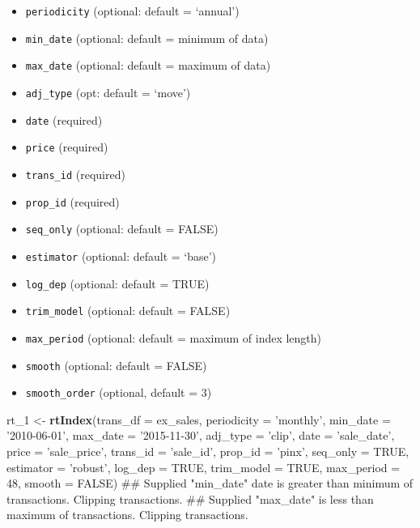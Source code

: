 \documentclass[]{article}
\newenvironment{Shaded}{\begin{snugshade}}{\end{snugshade}}
\newcommand{\KeywordTok}[1]{\textcolor[rgb]{0.13,0.29,0.53}{\textbf{#1}}}
\newcommand{\DataTypeTok}[1]{\textcolor[rgb]{0.13,0.29,0.53}{#1}}
\newcommand{\DecValTok}[1]{\textcolor[rgb]{0.00,0.00,0.81}{#1}}
\newcommand{\StringTok}[1]{\textcolor[rgb]{0.31,0.60,0.02}{#1}}
\newcommand{\OtherTok}[1]{\textcolor[rgb]{0.56,0.35,0.01}{#1}}
\newcommand{\NormalTok}[1]{#1}
\providecommand{\tightlist}{%
  \setlength{\itemsep}{0pt}\setlength{\parskip}{0pt}}
\begin{document}
\begin{itemize}
\tightlist
\item
  \texttt{periodicity} (optional: default = `annual')
\item
  \texttt{min\_date} (optional: default = minimum of data)
\item
  \texttt{max\_date} (optional: default = maximum of data)
\item
  \texttt{adj\_type} (opt: default = `move')
\item
  \texttt{date} (required)
\item
  \texttt{price} (required)
\item
  \texttt{trans\_id} (required)
\item
  \texttt{prop\_id} (required)
\item
  \texttt{seq\_only} (optional: default = FALSE)
\item
  \texttt{estimator} (optional: default = `base')
\item
  \texttt{log\_dep} (optional: default = TRUE)
\item
  \texttt{trim\_model} (optional: default = FALSE)
\item
  \texttt{max\_period} (optional: default = maximum of index length)
\item
  \texttt{smooth} (optional: default = FALSE)
\item
  \texttt{smooth\_order} (optional, default = 3)
\end{itemize}

\begin{Shaded}
\begin{Highlighting}[]
\NormalTok{  rt_}\DecValTok{1}\NormalTok{ <-}\StringTok{ }\KeywordTok{rtIndex}\NormalTok{(}\DataTypeTok{trans_df =}\NormalTok{ ex_sales,}
                  \DataTypeTok{periodicity =} \StringTok{'monthly'}\NormalTok{,}
                  \DataTypeTok{min_date =} \StringTok{'2010-06-01'}\NormalTok{,}
                  \DataTypeTok{max_date =} \StringTok{'2015-11-30'}\NormalTok{,}
                  \DataTypeTok{adj_type =} \StringTok{'clip'}\NormalTok{,}
                  \DataTypeTok{date =} \StringTok{'sale_date'}\NormalTok{,}
                  \DataTypeTok{price =} \StringTok{'sale_price'}\NormalTok{,}
                  \DataTypeTok{trans_id =} \StringTok{'sale_id'}\NormalTok{,}
                  \DataTypeTok{prop_id =} \StringTok{'pinx'}\NormalTok{,}
                  \DataTypeTok{seq_only =} \OtherTok{TRUE}\NormalTok{,}
                  \DataTypeTok{estimator =} \StringTok{'robust'}\NormalTok{,}
                  \DataTypeTok{log_dep =} \OtherTok{TRUE}\NormalTok{,}
                  \DataTypeTok{trim_model =} \OtherTok{TRUE}\NormalTok{,}
                  \DataTypeTok{max_period =} \DecValTok{48}\NormalTok{,}
                  \DataTypeTok{smooth =} \OtherTok{FALSE}\NormalTok{)}
\NormalTok{## Supplied "min_date" date is greater than minimum of transactions. Clipping transactions.}
\NormalTok{## Supplied "max_date" is less than maximum of transactions. Clipping transactions.}
\end{Highlighting}
\end{Shaded}
\end{document}
